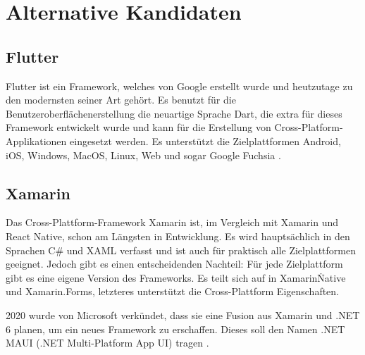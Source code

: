 \section{Alternative Kandidaten}
\subsection{Flutter}
\label{flutter}
Flutter ist ein Framework, welches von Google erstellt wurde und heutzutage zu den modernsten seiner
Art gehört. Es benutzt für die Benutzeroberflächenerstellung die neuartige Sprache Dart, die extra
für dieses Framework entwickelt wurde und kann für die Erstellung von Cross-Platform-Applikationen
eingesetzt werden. Es unterstützt die Zielplattformen Android, iOS, Windows, MacOS, Linux, Web und
sogar Google Fuchsia \cite{flutter}.

\subsection{Xamarin}
\label{xamarin}
Das Cross-Plattform-Framework Xamarin ist, im Vergleich mit Xamarin und React Native, schon am
Längsten in Entwicklung. Es wird hauptsächlich in den Sprachen C\# und XAML verfasst und ist auch
für praktisch alle Zielplattformen geeignet. Jedoch gibt es einen entscheidenden Nachteil: Für jede
Zielplattform gibt es eine eigene Version des Frameworks. Es teilt sich auf in Xamarin\.Native und
Xamarin.Forms, letzteres unterstützt die Cross-Plattform Eigenschaften.

2020 wurde von Microsoft verkündet, dass sie eine Fusion aus Xamarin und .NET 6 planen, um ein
neues Framework zu erschaffen. Dieses soll den Namen .NET MAUI (.NET Multi-Platform App UI) tragen
\cite{xamarin}.